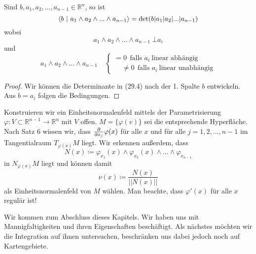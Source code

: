 \begin{lemma}
Sind $b, a_1,a_2,...,a_{n-1}\in\mathbb{R}^n$, so ist
\begin{equation}
\left\langle b \ \middle| \ a_1\wedge a_2\wedge...\wedge a_{n-1}\right\rangle=\det (b | a_1|a_2|...|a_{n-1})
\end{equation}
wobei
\begin{equation*}
a_1\wedge a_2\wedge...\wedge a_{n-1} \ \bot a_i
\end{equation*}
und
\begin{equation*}
a_1\wedge a_2\wedge...\wedge a_{n-1} \ \ \ \ \ \left\{\begin{matrix}
=0 \ \ \text{falls\ }a_i\ \text{linear abhängig} \\
\ \ \ \ \ \neq 0 \ \ \text{falls\ }a_i\ \text{linear unabhängig}
\end{matrix}\right.
\end{equation*}
\end{lemma}

\begin{proof}
Wir können die Determinante in (29.4) nach der 1. Spalte $b$ entwickeln. Aus $b=a_i$ folgen die Bedingungen.
\end{proof}

\begin{beispiel}
Konstruieren wir ein Einheitsnormalenfeld mittels der Parametrisierung $\varphi:V\subset\mathbb{R}^{n-1}\rightarrow\mathbb{R}^n$ mit $V$ offen. 
$M=\{\varphi(v)\}$ sei die entsprechende Hyperfläche. Nach Satz 6 wissen wir, dass $\frac{\partial{}}{\partial{x_j}}\varphi(x)$ für alle $x$ und für alle $j=1,2,...,n-1$ im Tangentialraum $T_{\varphi(x)}M$ liegt. Wir erkennen außerdem, dass 
\begin{equation*}
N(x)\coloneqq\varphi_{x_1}(x)\wedge\varphi_{x_2}(x)\wedge ... \wedge\varphi_{x_{n-1}}
\end{equation*}
in $N_{\varphi(x)}M$ liegt und können damit
\begin{equation*}
\nu(x)\coloneqq\frac{N(x)}{||N(x)||}
\end{equation*}
als Einheitsnormalenfeld von $M$ wählen. Man beachte, dass $\varphi'(x)$ für alle $x$ regulär ist!
\end{beispiel}
Wir kommen zum Abschluss dieses Kapitels. Wir haben uns mit Mannigfaltigkeiten und ihren Eigenschaften beschäftigt. Als nächstes möchten wir die Integration auf ihnen untersuchen, beschränken uns dabei jedoch noch auf Kartengebiete.

